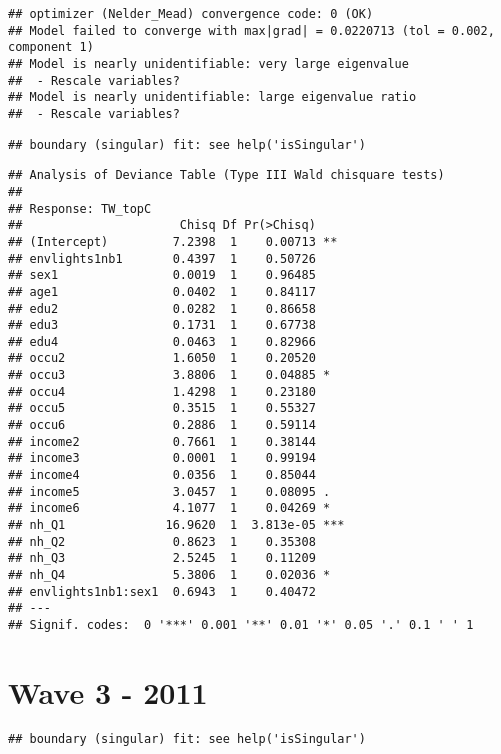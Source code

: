 \documentclass[
]{book}
\begin{document}
\begin{verbatim}
## optimizer (Nelder_Mead) convergence code: 0 (OK)
## Model failed to converge with max|grad| = 0.0220713 (tol = 0.002, component 1)
## Model is nearly unidentifiable: very large eigenvalue
##  - Rescale variables?
## Model is nearly unidentifiable: large eigenvalue ratio
##  - Rescale variables?
\end{verbatim}

\begin{verbatim}
## boundary (singular) fit: see help('isSingular')
\end{verbatim}

\begin{verbatim}
## Analysis of Deviance Table (Type III Wald chisquare tests)
## 
## Response: TW_topC
##                      Chisq Df Pr(>Chisq)    
## (Intercept)         7.2398  1    0.00713 ** 
## envlights1nb1       0.4397  1    0.50726    
## sex1                0.0019  1    0.96485    
## age1                0.0402  1    0.84117    
## edu2                0.0282  1    0.86658    
## edu3                0.1731  1    0.67738    
## edu4                0.0463  1    0.82966    
## occu2               1.6050  1    0.20520    
## occu3               3.8806  1    0.04885 *  
## occu4               1.4298  1    0.23180    
## occu5               0.3515  1    0.55327    
## occu6               0.2886  1    0.59114    
## income2             0.7661  1    0.38144    
## income3             0.0001  1    0.99194    
## income4             0.0356  1    0.85044    
## income5             3.0457  1    0.08095 .  
## income6             4.1077  1    0.04269 *  
## nh_Q1              16.9620  1  3.813e-05 ***
## nh_Q2               0.8623  1    0.35308    
## nh_Q3               2.5245  1    0.11209    
## nh_Q4               5.3806  1    0.02036 *  
## envlights1nb1:sex1  0.6943  1    0.40472    
## ---
## Signif. codes:  0 '***' 0.001 '**' 0.01 '*' 0.05 '.' 0.1 ' ' 1
\end{verbatim}

\hypertarget{wave-3---2011}{%
\section{Wave 3 - 2011}\label{wave-3---2011}}

\begin{verbatim}
## boundary (singular) fit: see help('isSingular')
\end{verbatim}
\end{document}
